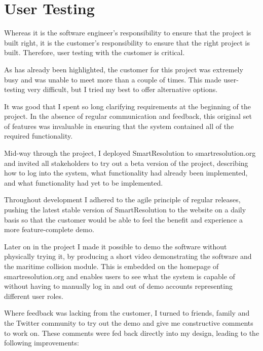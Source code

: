 \section{User Testing}

Whereas it is the software engineer's responsibility to ensure that the project is built right, it is the customer's responsibility to ensure that the right project is built. Therefore, user testing with the customer is critical.

As has already been highlighted, the customer for this project was extremely busy and was unable to meet more than a couple of times. This made user-testing very difficult, but I tried my best to offer alternative options.

It was good that I spent so long clarifying requirements at the beginning of the project. In the absence of regular communication and feedback, this original set of features was invaluable in ensuring that the system contained all of the required functionality.

Mid-way through the project, I deployed SmartResolution to smartresolution.org and invited all stakeholders to try out a beta version of the project, describing how to log into the system, what functionality had already been implemented, and what functionality had yet to be implemented.

Throughout development I adhered to the agile principle of regular releases, pushing the latest stable version of SmartResolution to the website on a daily basis so that the customer would be able to feel the benefit and experience a more feature-complete demo.

Later on in the project I made it possible to demo the software without physically trying it, by producing a short video demonstrating the software and the maritime collision module. This is embedded on the homepage of smartresolution.org and enables users to see what the system is capable of without having to manually log in and out of demo accounts representing different user roles.

Where feedback was lacking from the customer, I turned to friends, family and the Twitter community to try out the demo and give me constructive comments to work on. These comments were fed back directly into my design, leading to the following improvements:

